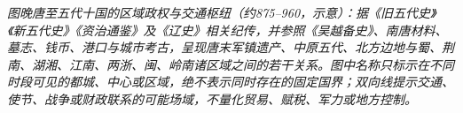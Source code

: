\begin{center}

\smallskip
\small\textit{图\quad 晚唐至五代十国的区域政权与交通枢纽（约875--960，示意）：据《旧五代史》《新五代史》《资治通鉴》及《辽史》相关纪传，并参照《吴越备史》、南唐材料、墓志、钱币、港口与城市考古，呈现唐末军镇遗产、中原五代、北方边地与蜀、荆南、湖湘、江南、两浙、闽、岭南诸区域之间的若干关系。图中名称只标示在不同时段可见的都城、中心或区域，绝不表示同时存在的固定国界；双向线提示交通、使节、战争或财政联系的可能场域，不量化贸易、赋税、军力或地方控制。}
\end{center}
